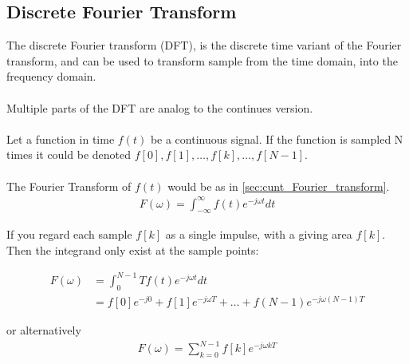 \subsection{Discrete Fourier Transform}
%
%

The discrete Fourier transform (DFT), is the discrete time variant of the Fourier transform, and can be used to transform sample from the time domain, into the frequency domain.
\\\\
Multiple parts of the DFT are analog to the continues version.
\\\\
Let a function in time $f(t)$ be a continuous signal.
If the function is sampled N times it could be denoted
$f[0],f[1],\dots,f[k],\dots,f[N-1]$.
\\\\
The Fourier Transform of $f(t)$ would be as in \ref{sec:cunt_Fourier_transform}.
\begin{align*}
	F(\omega) = \int_{-\infty}^\infty f(t)e^{-j\omega t} dt
\end{align*}

If you regard each sample $f[k]$ as a single impulse, with a giving area $f[k]$. Then the integrand only exist at the sample points:

\begin{align*}
	F(\omega) 
	&= \int_0^{N-1}T f(t) e^{-j\omega t}dt\\
	&= f[0]e^{-j0} + f[1]e^{-j\omega T} + \dots + f(N-1) e^{-j\omega(N-1)T}	
\end{align*}

or alternatively
\begin{align*}
	F(\omega) = \sum_{k=0}^{N-1}f[k]e^{-j\omega k T}
\end{align*} 

